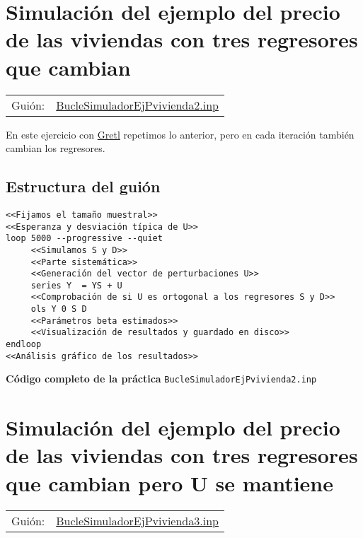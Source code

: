 \documentclass[11pt]{article}
\begin{document}
\section{Simulación del ejemplo del precio de las viviendas con tres regresores que cambian}
\label{sec:org7fef4a2}

\begin{center}
\begin{tabular}{ll}
Guión: & \href{https://github.com/mbujosab/Ectr/tree/master/Practicas/Gretl/scripts/BucleSimuladorEjPvivienda2.inp}{BucleSimuladorEjPvivienda2.inp}\\[0pt]
\end{tabular}
\end{center}

En este ejercicio con \href{https://gretl.sourceforge.net/es.html}{Gretl} repetimos lo anterior, pero en cada
iteración también cambian los regresores.

\subsection{Estructura del guión}
\label{sec:org0f6d24a}

\begin{verbatim}
<<Fijamos el tamaño muestral>>
<<Esperanza y desviación típica de U>>
loop 5000 --progressive --quiet
     <<Simulamos S y D>>
     <<Parte sistemática>>
     <<Generación del vector de perturbaciones U>>
     series Y  = YS + U
     <<Comprobación de si U es ortogonal a los regresores S y D>>
     ols Y 0 S D
     <<Parámetros beta estimados>>
     <<Visualización de resultados y guardado en disco>>
endloop
<<Análisis gráfico de los resultados>>
\end{verbatim}

\noindent
\textbf{Código completo de la práctica} \texttt{BucleSimuladorEjPvivienda2.inp}
\vspace{10pt}

\clearpage


\section{Simulación del ejemplo del precio de las viviendas con tres regresores que cambian pero U se mantiene}
\label{sec:org2edd499}

\begin{center}
\begin{tabular}{ll}
Guión: & \href{https://github.com/mbujosab/Ectr/tree/master/Practicas/Gretl/scripts/BucleSimuladorEjPvivienda3.inp}{BucleSimuladorEjPvivienda3.inp}\\[0pt]
\end{tabular}
\end{center}
\end{document}
